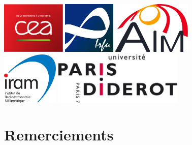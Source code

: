 \documentclass[a4paper,10pt,french]{article}
\begin{document}
\begin{center}
    \vspace{0.5cm}

    \hfill \includegraphics[height=2.5cm]{logo_cea.pdf} \hfill \includegraphics[height=2.5cm]{logo_irfu.png} \hfill \includegraphics[height=2.5cm]{logo_aim.jpg} \hfill \null \\
    \vspace{0.5cm}
    \hfill \includegraphics[height=2.5cm]{logo_iram.png} \hfill \includegraphics[height=2.5cm]{logo_upd.png} \hfill \null \\

\end{center}

\vfill
\hfill \thedate

\newpage

\thispagestyle{empty}

\section*{Remerciements}

\tableofcontents
\end{document}
